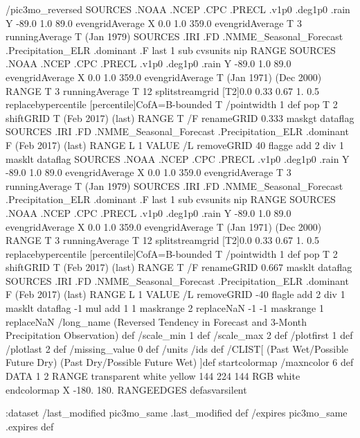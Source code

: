 \begin{ingrid}
/pic3mo_reversed {
 SOURCES .NOAA .NCEP .CPC .PRECL .v1p0 .deg1p0 .rain
  Y -89.0 1.0 89.0 evengridAverage
  X 0.0 1.0 359.0 evengridAverage
  T 3 runningAverage
  T (Jan 1979) SOURCES .IRI .FD .NMME_Seasonal_Forecast .Precipitation_ELR .dominant .F last 1 sub cvsunits nip RANGE
  SOURCES .NOAA .NCEP .CPC .PRECL .v1p0 .deg1p0 .rain
   Y -89.0 1.0 89.0 evengridAverage
   X 0.0 1.0 359.0 evengridAverage
   T (Jan 1971) (Dec 2000) RANGE
   T 3 runningAverage
   T 12 splitstreamgrid
   [T2]0.0 0.33 0.67 1. 0.5 replacebypercentile
   [percentile]CofA=B-bounded
  T
   /pointwidth 1 def
   pop
  T 2 shiftGRID
  T (Feb 2017) (last) RANGE
  T /F renameGRID
  0.333 maskgt
  dataflag
  SOURCES .IRI .FD .NMME_Seasonal_Forecast .Precipitation_ELR .dominant
   F (Feb 2017) (last) RANGE
   L 1 VALUE
   /L removeGRID
   40 flagge
   add
  2 div
  1 masklt
  dataflag
  SOURCES .NOAA .NCEP .CPC .PRECL .v1p0 .deg1p0 .rain
   Y -89.0 1.0 89.0 evengridAverage
   X 0.0 1.0 359.0 evengridAverage
   T 3 runningAverage
   T (Jan 1979) SOURCES .IRI .FD .NMME_Seasonal_Forecast .Precipitation_ELR .dominant .F last 1 sub cvsunits nip RANGE
  SOURCES .NOAA .NCEP .CPC .PRECL .v1p0 .deg1p0 .rain
    Y -89.0 1.0 89.0 evengridAverage
    X 0.0 1.0 359.0 evengridAverage
    T (Jan 1971) (Dec 2000) RANGE  
    T 3 runningAverage
    T 12 splitstreamgrid
    [T2]0.0 0.33 0.67 1. 0.5 replacebypercentile
    [percentile]CofA=B-bounded
   T
    /pointwidth 1 def
    pop
   T 2 shiftGRID
   T (Feb 2017) (last) RANGE
   T /F renameGRID
   0.667 masklt
   dataflag
   SOURCES .IRI .FD .NMME_Seasonal_Forecast .Precipitation_ELR .dominant
    F (Feb 2017) (last) RANGE 
    L 1 VALUE
    /L removeGRID
    -40 flagle
    add
   2 div
   1 masklt
   dataflag
   -1 mul
   add
  1 1 maskrange
  2 replaceNaN
  -1 -1 maskrange
  1 replaceNaN
  /long_name (Reversed Tendency in Forecast and 3-Month Precipitation Observation) def
  /scale_min 1 def
  /scale_max 2 def
  /plotfirst 1 def
  /plotlast 2 def
  /missing_value 0 def
  /units /ids def
  /CLIST[ (Past Wet/Possible Future Dry) (Past Dry/Possible Future Wet) ]def
  startcolormap
    /maxncolor 6 def
    DATA
    1 2 RANGE
    transparent white yellow 144
         224 144 RGB
         white endcolormap
 X -180. 180. RANGEEDGES
} defasvarsilent

:dataset
/last_modified pic3mo_same .last_modified def
/expires pic3mo_same .expires def
\end{ingrid}
